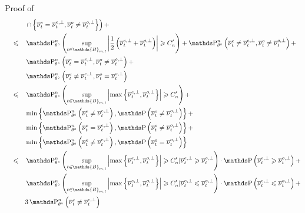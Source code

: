 \begin{pro}{Proof of \\}
\begin{alignat*}{3}
& && && \left.\cap \left\{ \overline{\nu}_{t}^{e} = \overline{\nu}_{t}^{e, \perp}, \overline{\nu}_{t}^{o} \neq \overline{\nu}_{t}^{o, \perp} \right\}\right) +\notag\\
& && \leq && \P_{\theta^{\circ}}^{n}\left(\sup\limits_{t \in \mathds{B}_{m, l}} \left\vert \frac{1}{2} \left(\overline{\nu}_{t}^{e, \perp} + \overline{\nu}_{t}^{o, \perp} \right) \right\vert \geq C_{n}'\right) + \P_{\theta^{\circ}}^{n}\left(\overline{\nu}_{t}^{e} \neq \overline{\nu}_{t}^{e, \perp}, \overline{\nu}_{t}^{o} \neq \overline{\nu}_{t}^{o, \perp}\right) +\notag\\
& && && \P_{\theta^{\circ}}^{n}\left(\overline{\nu}_{t}^{e} = \overline{\nu}_{t}^{e, \perp}, \overline{\nu}_{t}^{o} \neq \overline{\nu}_{t}^{o, \perp}\right) +\notag\\
& && && \P_{\theta^{\circ}}^{n}\left(\overline{\nu}_{t}^{e} \neq \overline{\nu}_{t}^{e, \perp}, \overline{\nu}_{t}^{o} = \overline{\nu}_{t}^{o, \perp}\right)\notag\\
& && \leq && \P_{\theta^{\circ}}^{n}\left(\sup\limits_{t \in \mathds{B}_{m, l}} \left\vert \max\left\{ \overline{\nu}_{t}^{e, \perp}, \overline{\nu}_{t}^{o, \perp} \right\} \right\vert \geq C_{n}'\right) + \notag\\
& && &&\min\left\{\P_{\theta^{\circ}}^{n}\left(\overline{\nu}_{t}^{e} \neq \overline{\nu}_{t}^{e, \perp}\right), \P\left(\overline{\nu}_{t}^{o} \neq \overline{\nu}_{t}^{o, \perp}\right)\right\} +\notag\\
& && &&\min\left\{\P_{\theta^{\circ}}^{n}\left(\overline{\nu}_{t}^{e} = \overline{\nu}_{t}^{e, \perp}\right), \P\left(\overline{\nu}_{t}^{o} \neq \overline{\nu}_{t}^{o, \perp}\right)\right\} +\notag\\
& && &&\min\left\{\P_{\theta^{\circ}}^{n}\left(\overline{\nu}_{t}^{e} \neq \overline{\nu}_{t}^{e, \perp}\right), \P\left(\overline{\nu}_{t}^{o} = \overline{\nu}_{t}^{o, \perp}\right)\right\}\notag\\
& && \leq && \P_{\theta^{\circ}}^{n}\left(\sup\limits_{t \in \mathds{B}_{m, l}} \left\vert \max\left\{ \overline{\nu}_{t}^{e, \perp}, \overline{\nu}_{t}^{o, \perp} \right\} \right\vert \geq C_{n}' \vert \overline{\nu}_{t}^{e, \perp}\geq \overline{\nu}_{t}^{o, \perp} \right)\cdot \P\left(\overline{\nu}_{t}^{e, \perp}\geq \overline{\nu}_{t}^{o, \perp}\right) +\notag\\
& && && \P_{\theta^{\circ}}^{n}\left(\sup\limits_{t \in \mathds{B}_{m, l}} \left\vert \max\left\{ \overline{\nu}_{t}^{e, \perp}, \overline{\nu}_{t}^{o, \perp} \right\} \right\vert \geq C_{n}' \vert \overline{\nu}_{t}^{e, \perp}\leq \overline{\nu}_{t}^{o, \perp} \right)\cdot \P\left(\overline{\nu}_{t}^{e, \perp}\leq \overline{\nu}_{t}^{o, \perp}\right) + \notag\\
& && && 3 \P_{\theta^{\circ}}^{n}\left(\overline{\nu}_{t}^{e} \neq \overline{\nu}_{t}^{e, \perp}\right)
\end{alignat*}


\end{pro}
